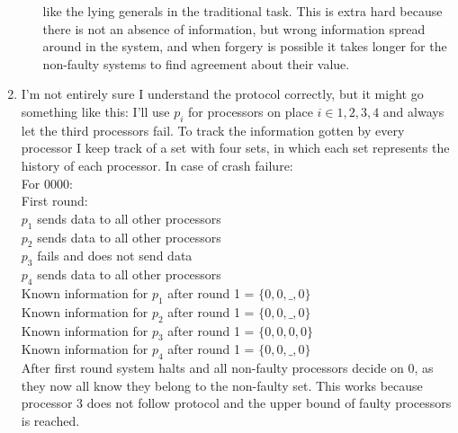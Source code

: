 \documentclass[12pt]{article} %
\begin{document}
\begin{enumerate}
\begin{itemize}
                like the lying generals in the traditional
                task. This is extra hard because there is not an absence of
                information, but wrong information spread around in the system,
                and when forgery is possible it takes longer for the
                non-faulty
                systems to find agreement about their value.
        \end{itemize}
    \item I'm not entirely sure I understand the protocol correctly, but it
        might go something like this: 
        I'll use $p_i$ for processors on place $i \in {1, 2, 3, 4}$
        and always let the third processors fail.
        To track the information gotten by every processor I keep track of a set
        with four sets, in which each set represents the history of each
        processor. 
        In case of crash failure:\\
        For 0000:\\
        First round:\\
        $p_1$ sends data to all other processors\\ 
        $p_2$ sends data to all other processors\\
        $p_3$ fails and does not send data\\
        $p_4$ sends data to all other processors\\
        Known information for $p_1$ after round 1 = $\{0, 0, \_, 0\}$\\
        Known information for $p_2$ after round 1 = $\{0, 0, \_, 0\}$\\
        Known information for $p_3$ after round 1 = $\{0, 0, 0, 0\}$\\
        Known information for $p_4$ after round 1 = $\{0, 0, \_, 0\}$\\
        After first round system halts and all non-faulty processors decide on 0,
        as they now all know they belong to the non-faulty set. This works
        because processor 3 does not follow protocol and the upper bound of
        faulty processors is reached. 


\end{enumerate}
\end{document}
